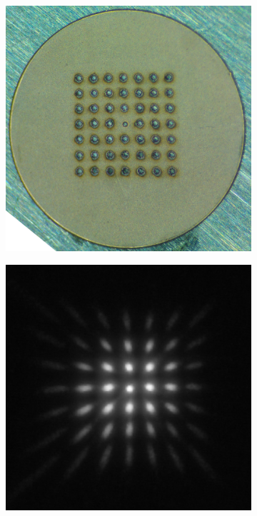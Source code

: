 \begin{figure}
    \centering
    \begin{subfigure}{0.49\linewidth}
    \centering
    \includegraphics[width=\linewidth]{part2/Figs/example_pepperpot_mask.jpg}
    \caption{}
    \label{figure:pepperpot_mask}
    \end{subfigure}
    \begin{subfigure}{0.49\linewidth}
    \centering
    \includegraphics[width=\linewidth]{part2/Figs/example_pepperpot_detector_linear.jpeg}
    \caption{}
    \label{figure:pepperpot_image}
    \end{subfigure}
    

\end{figure}
